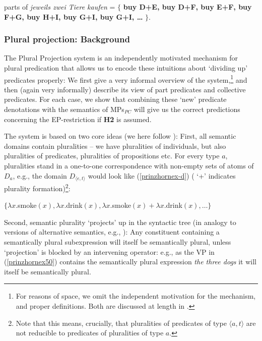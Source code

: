 \documentclass[output=paper,colorlinks,citecolor=brown,
]{langscibook}
\begin{document}
\ea 
 parts of \textit{jeweils zwei Tiere kaufen} = $\{$ \textbf{buy D+E, buy D+F, buy E+F,  buy F+G, buy H+I, buy G+I, buy G+I, \dots} $\}$.\label{prinzhornex46c}
\z










\subsubsection{Plural projection: Background}\label{prinzhornsec:4.2.1}

The Plural Projection system \citep{Schmitt:2019, Haslinger:2018a, Haslinger:2018b} is an independently motivated mechanism for plural predication that allows us to encode these intuitions about `dividing up' predicates properly: We first give a very informal overview of the system,\footnote{For reasons of space, we omit the independent motivation for the mechanism, and proper definitions. Both are discussed at length in \citealt{Schmitt:2019, Haslinger:2018a, Haslinger:2018b}.} and then (again very informally) describe its view of part predicates and collective predicates. For each case, we show that combining these `new' predicate denotations with the semantics of MPs$_{PC}$ will give us the correct predictions concerning the EP-restriction if \textbf{H2} is assumed.



The system  is based on two core ideas (we here follow \cite{Haslinger:2018b}): First, all semantic domains contain pluralities -- we have pluralities of individuals, but also pluralities of predicates, pluralities of propositions etc. For every type $a$, pluralities stand in a one-to-one correspondence with non-empty sets of atoms of $D_{a}$, e.g., the domain $D_{\langle e,t \rangle}$ would look like (\ref{prinzhornex-d}) ( `+'  indicates plurality formation)\footnote{Note that this means, crucially, that pluralities of predicates of type $\langle a,t \rangle$ are not reducible to predicates of  pluralities of type $a$.}: 



\ea	 $\{ \lambda x. $smoke$(x), \lambda x. $drink$(x), \lambda x. $smoke$(x) + \lambda x.  $drink$(x), \dots\}$ \label{prinzhornex-d} \z

Second, semantic plurality `projects' up in the syntactic tree (in analogy to versions of alternative semantics, e.g., \citealt{Rooth:1985}):
 Any constituent containing a semantically plural subexpression will itself be semantically plural, unless `projection'  is blocked by an intervening operator: e.g., as the VP in (\ref{prinzhornex50}) contains the semantically plural expression \textit{the three dogs} it will itself be semantically plural.
 
\end{document}
